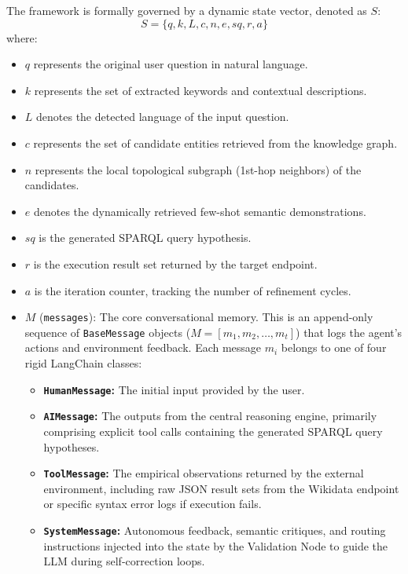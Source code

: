 The framework is formally governed by a dynamic state vector, denoted as $S$:
\begin{equation}
    S = \{q, k, L, c, n, e, sq, r, a\}
\end{equation}
where:
\begin{itemize}
    \item $q$ represents the original user question in natural language.
    \item $k$ represents the set of extracted keywords and contextual descriptions.
    \item $L$ denotes the detected language of the input question.
    \item $c$ represents the set of candidate entities retrieved from the knowledge graph.
    \item $n$ represents the local topological subgraph (1st-hop neighbors) of the candidates.
    \item $e$ denotes the dynamically retrieved few-shot semantic demonstrations.
    \item $sq$ is the generated SPARQL query hypothesis.
    \item $r$ is the execution result set returned by the target endpoint.
    \item $a$ is the iteration counter, tracking the number of refinement cycles.
     \item $M$ (\texttt{messages}): The core conversational memory. This is an append-only sequence of \texttt{BaseMessage} objects ($M = [m_1, m_2, \dots, m_t]$) that logs the agent's actions and environment feedback. Each message $m_i$ belongs to one of four rigid LangChain classes:
    \begin{itemize}
        \item \textbf{\texttt{HumanMessage}:} The initial input provided by the user.
        \item \textbf{\texttt{AIMessage}:} The outputs from the central reasoning engine, primarily comprising explicit tool calls containing the generated SPARQL query hypotheses.
        \item \textbf{\texttt{ToolMessage}:} The empirical observations returned by the external environment, including raw JSON result sets from the Wikidata endpoint or specific syntax error logs if execution fails.
        \item \textbf{\texttt{SystemMessage}:} Autonomous feedback, semantic critiques, and routing instructions injected into the state by the Validation Node to guide the LLM during self-correction loops.
    \end{itemize}
\end{itemize}


